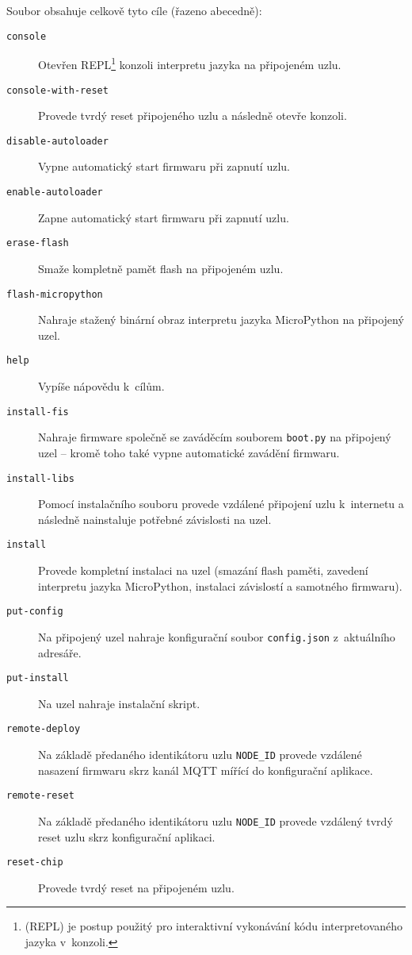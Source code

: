 Soubor  obsahuje celkově tyto cíle (řazeno abecedně):
\begin{description}
    \item[\texttt{console}] Otevřen REPL\footnote{ (REPL) je postup použitý pro
    interaktivní vykonávání kódu interpretovaného jazyka v~konzoli.} konzoli interpretu jazyka na připojeném uzlu.
    \item[\texttt{console-with-reset}] Provede tvrdý reset připojeného uzlu a následně otevře konzoli.
    \item[\texttt{disable-autoloader}] Vypne automatický start firmwaru při zapnutí uzlu.
    \item[\texttt{enable-autoloader}] Zapne automatický start firmwaru při zapnutí uzlu.
    \item[\texttt{erase-flash}] Smaže kompletně pamět flash na připojeném uzlu.
    \item[\texttt{flash-micropython}] Nahraje stažený binární obraz interpretu jazyka MicroPython na připojený uzel.
    \item[\texttt{help}] Vypíše nápovědu k~cílům.
    \item[\texttt{install-fis}] Nahraje firmware společně se zaváděcím souborem \texttt{boot.py} na připojený uzel --
    kromě toho také vypne automatické zavádění firmwaru.
    \item[\texttt{install-libs}] Pomocí instalačního souboru provede vzdálené připojení uzlu k~internetu a následně
    nainstaluje potřebné závislosti na uzel.
    \item[\texttt{install}] Provede kompletní instalaci na uzel (smazání flash paměti, zavedení interpretu jazyka
    MicroPython, instalaci závislostí a samotného firmwaru).
    \item[\texttt{put-config}] Na připojený uzel nahraje konfigurační soubor \texttt{config.json} z~aktuálního adresáře.
    \item[\texttt{put-install}] Na uzel nahraje instalační skript.
    \item[\texttt{remote-deploy}] Na základě předaného identikátoru uzlu \texttt{NODE\_ID} provede vzdálené nasazení
    firmwaru skrz kanál MQTT mířící do konfigurační aplikace.
    \item[\texttt{remote-reset}] Na základě předaného identikátoru uzlu \texttt{NODE\_ID} provede vzdálený tvrdý
    reset uzlu skrz konfigurační aplikaci.
    \item[\texttt{reset-chip}] Provede tvrdý reset na připojeném uzlu.
\end{description}
